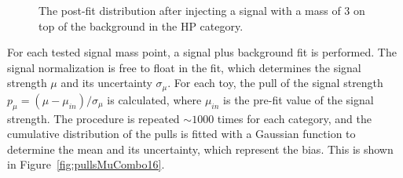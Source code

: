 \begin{figure}[h!]
\caption{The post-fit distribution after injecting a signal with a mass of 3 \TeV on top of the background in the HP category.}
\label{fig:signalToy}
\end{figure}
For each tested signal mass point, a signal plus background fit is performed. The signal normalization is free to float in the fit, which determines the signal strength $\mu$ and its uncertainty $\sigma_\mu$. For each toy, the pull of the signal strength $p_\mu = (\mu-\mu_{in})/\sigma_\mu$ is calculated, where $\mu_{in}$ is the pre-fit value of the signal strength. The procedure is repeated $\sim 1000$ times for each category, and the cumulative distribution of the pulls is fitted with a Gaussian function to determine the mean and its uncertainty, which represent the bias. This is shown in Figure~\ref{fig:pullsMuCombo16}.
